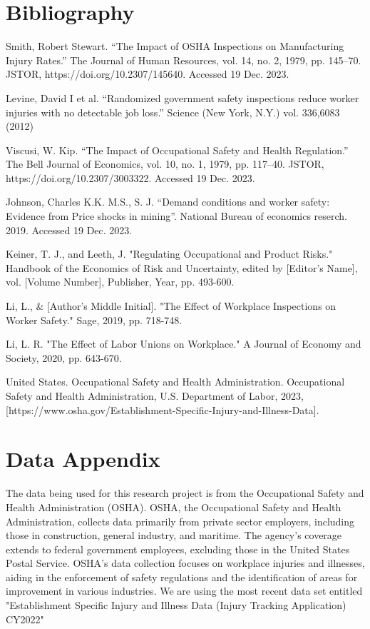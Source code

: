 \documentclass[12pt]{article}
\begin{document}
\newpage
\section*{Bibliography}
\doublespacing
\setlength\bibsep{0pt}

\indent Smith, Robert Stewart. “The Impact of OSHA Inspections on Manufacturing Injury Rates.” The Journal of Human Resources, vol. 14, no. 2, 1979, pp. 145–70. JSTOR, https://doi.org/10.2307/145640. Accessed 19 Dec. 2023. 

\indent Levine, David I et al. “Randomized government safety inspections reduce worker injuries with no detectable job loss.” Science (New York, N.Y.) vol. 336,6083 (2012)

\indent Viscusi, W. Kip. “The Impact of Occupational Safety and Health Regulation.” The Bell Journal of Economics, vol. 10, no. 1, 1979, pp. 117–40. JSTOR, https://doi.org/10.2307/3003322. Accessed 19 Dec. 2023. 

\indent Johnson, Charles K.K. M.S., S. J. “Demand conditions and worker safety: Evidence from Price shocks in mining”. National Bureau of economics reserch. 2019. Accessed 19 Dec. 2023.  

\indent Keiner, T. J., and Leeth, J. "Regulating Occupational and Product Risks." Handbook of the Economics of Risk and Uncertainty, edited by [Editor's Name], vol. [Volume Number], Publisher, Year, pp. 493-600. 

\indent Li, L., \& [Author's Middle Initial]. "The Effect of Workplace Inspections on Worker Safety." Sage, 2019, pp. 718-748. 

\indent Li, L. R. "The Effect of Labor Unions on Workplace." A Journal of Economy and Society, 2020, pp. 643-670. 

\indent United States. Occupational Safety and Health Administration. Occupational Safety and Health Administration, U.S. Department of Labor, 2023, [https://www.osha.gov/Establishment-Specific-Injury-and-Illness-Data]. 

\newpage
\section*{ Data Appendix} \label{sec:appendixa}

The data being used for this research project is from the Occupational Safety and Health Administration (OSHA). OSHA, the Occupational Safety and Health Administration, collects data primarily from private sector employers, including those in construction, general industry, and maritime. The agency's coverage extends to federal government employees, excluding those in the United States Postal Service. OSHA's data collection focuses on workplace injuries and illnesses, aiding in the enforcement of safety regulations and the identification of areas for improvement in various industries. We are using the most recent data set entitled "Establishment Specific Injury and Illness Data (Injury Tracking Application) CY2022"
\end{document}
